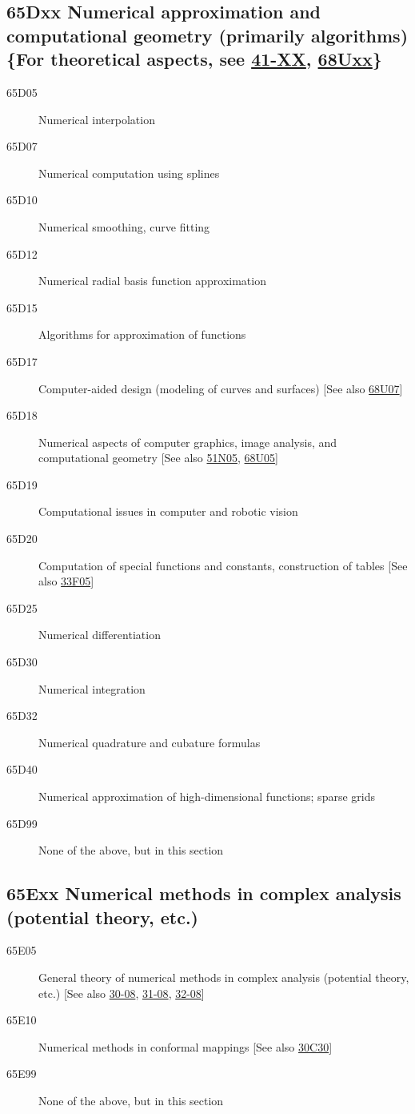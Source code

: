 \documentclass[letterpaper]{article}
\begin{document}
\subsection*{65Dxx  Numerical approximation and computational geometry (primarily algorithms) \{For theoretical aspects, see \hyperref[41-XX]{41-XX}, \hyperref[68Uxx]{68Uxx}\} }\label{65Dxx}
\begin{description}  
\item [65D05]\label{65D05} Numerical interpolation
\item [65D07]\label{65D07} Numerical computation using splines
\item [65D10]\label{65D10} Numerical smoothing, curve fitting
\item [65D12]\label{65D12} Numerical radial basis function approximation
\item [65D15]\label{65D15} Algorithms for approximation of functions
\item [65D17]\label{65D17} Computer-aided design (modeling of curves and surfaces) [See also \hyperref[68U07]{68U07}]
\item [65D18]\label{65D18} Numerical aspects of computer graphics, image analysis, and computational geometry [See also \hyperref[51N05]{51N05}, \hyperref[68U05]{68U05}]
\item [65D19]\label{65D19} Computational issues in computer and robotic vision
\item [65D20]\label{65D20} Computation of special functions and constants, construction of tables [See also \hyperref[33F05]{33F05}]
\item [65D25]\label{65D25} Numerical differentiation
\item [65D30]\label{65D30} Numerical integration
\item [65D32]\label{65D32} Numerical quadrature and cubature formulas
\item [65D40]\label{65D40} Numerical approximation of high-dimensional functions; sparse grids
\item [65D99]\label{65D99} None of the above, but in this section
\end{description}
\subsection*{65Exx  Numerical methods in complex analysis (potential theory, etc.) }\label{65Exx}
\begin{description}  
\item [65E05]\label{65E05} General theory of numerical methods in complex analysis (potential theory, etc.) [See also \hyperref[30-08]{30-08}, \hyperref[31-08]{31-08}, \hyperref[32-08]{32-08}]
\item [65E10]\label{65E10} Numerical methods in conformal mappings [See also \hyperref[30C30]{30C30}]
\item [65E99]\label{65E99} None of the above, but in this section
\end{description}
\end{document}
